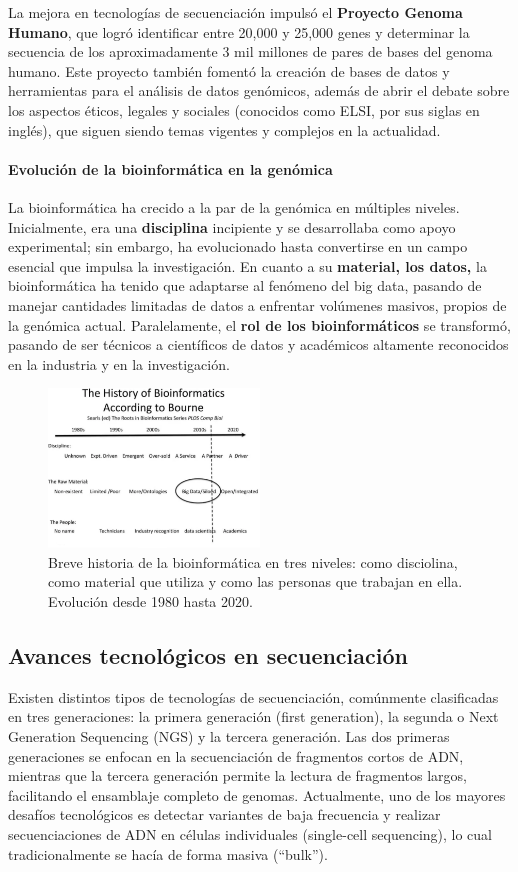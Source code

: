 La mejora en tecnologías de secuenciación impulsó el \textbf{Proyecto Genoma Humano}, que logró identificar entre 20,000 y 25,000 genes y determinar la secuencia de los aproximadamente 3 mil millones de pares de bases del genoma humano. Este proyecto también fomentó la creación de bases de datos y herramientas para el análisis de datos genómicos, además de abrir el debate sobre los aspectos éticos, legales y sociales (conocidos como ELSI, por sus siglas en inglés), que siguen siendo temas vigentes y complejos en la actualidad.

\paragraph{Evolución de la bioinformática en la genómica}
La bioinformática ha crecido a la par de la genómica en múltiples niveles. Inicialmente, era una \textbf{disciplina} incipiente y se desarrollaba como apoyo experimental; sin embargo, ha evolucionado hasta convertirse en un campo esencial que impulsa la investigación. En cuanto a su \textbf{material, los datos,} la bioinformática ha tenido que adaptarse al fenómeno del big data, pasando de manejar cantidades limitadas de datos a enfrentar volúmenes masivos, propios de la genómica actual. Paralelamente, el \textbf{rol de los bioinformáticos} se transformó, pasando de ser técnicos a científicos de datos y académicos altamente reconocidos en la industria y en la investigación.

\begin{figure}[htbp]
\centering
\includegraphics[width = 0.5\textwidth]{figs/history-bioinfo.png}
\caption{Breve historia de la bioinformática en tres niveles: como disciolina, como material que utiliza y como las personas que trabajan en ella. Evolución desde 1980 hasta 2020.}
\end{figure}

\subsection{Avances tecnológicos en secuenciación}
Existen distintos tipos de tecnologías de secuenciación, comúnmente clasificadas en tres generaciones: la primera generación (first generation), la segunda o Next Generation Sequencing (NGS) y la tercera generación. Las dos primeras generaciones se enfocan en la secuenciación de fragmentos cortos de ADN, mientras que la tercera generación permite la lectura de fragmentos largos, facilitando el ensamblaje completo de genomas. Actualmente, uno de los mayores desafíos tecnológicos es detectar variantes de baja frecuencia y realizar secuenciaciones de ADN en células individuales (single-cell sequencing), lo cual tradicionalmente se hacía de forma masiva (“bulk”).

